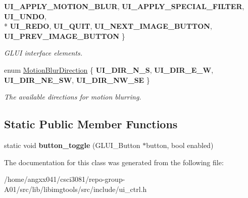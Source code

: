 \begin{DoxyCompactItemize}
{\bfseries U\+I\+\_\+\+A\+P\+P\+L\+Y\+\_\+\+M\+O\+T\+I\+O\+N\+\_\+\+B\+L\+UR}, 
{\bfseries U\+I\+\_\+\+A\+P\+P\+L\+Y\+\_\+\+S\+P\+E\+C\+I\+A\+L\+\_\+\+F\+I\+L\+T\+ER}, 
{\bfseries U\+I\+\_\+\+U\+N\+DO}, 
\\*
{\bfseries U\+I\+\_\+\+R\+E\+DO}, 
{\bfseries U\+I\+\_\+\+Q\+U\+IT}, 
{\bfseries U\+I\+\_\+\+N\+E\+X\+T\+\_\+\+I\+M\+A\+G\+E\+\_\+\+B\+U\+T\+T\+ON}, 
{\bfseries U\+I\+\_\+\+P\+R\+E\+V\+\_\+\+I\+M\+A\+G\+E\+\_\+\+B\+U\+T\+T\+ON}
 \}\hypertarget{classimage__tools_1_1UICtrl_a94c1180d7f5541b2d52d0f56ff6dfbd6}{}\label{classimage__tools_1_1UICtrl_a94c1180d7f5541b2d52d0f56ff6dfbd6}
\begin{DoxyCompactList}\small\item\em G\+L\+UI interface elements. \end{DoxyCompactList}
\item 
enum \hyperlink{classimage__tools_1_1UICtrl_a56d4f68bf91302769d7bc453d8d57cee}{Motion\+Blur\+Direction} \{ {\bfseries U\+I\+\_\+\+D\+I\+R\+\_\+\+N\+\_\+S}, 
{\bfseries U\+I\+\_\+\+D\+I\+R\+\_\+\+E\+\_\+W}, 
{\bfseries U\+I\+\_\+\+D\+I\+R\+\_\+\+N\+E\+\_\+\+SW}, 
{\bfseries U\+I\+\_\+\+D\+I\+R\+\_\+\+N\+W\+\_\+\+SE}
 \}\hypertarget{classimage__tools_1_1UICtrl_a56d4f68bf91302769d7bc453d8d57cee}{}\label{classimage__tools_1_1UICtrl_a56d4f68bf91302769d7bc453d8d57cee}
\begin{DoxyCompactList}\small\item\em The available directions for motion blurring. \end{DoxyCompactList}
\end{DoxyCompactItemize}
\subsection*{Static Public Member Functions}
\begin{DoxyCompactItemize}
\item 
static void {\bfseries button\+\_\+toggle} (G\+L\+U\+I\+\_\+\+Button $\ast$button, bool enabled)\hypertarget{classimage__tools_1_1UICtrl_ab69f0e1ea369485305d87820b61e1a50}{}\label{classimage__tools_1_1UICtrl_ab69f0e1ea369485305d87820b61e1a50}

\end{DoxyCompactItemize}


The documentation for this class was generated from the following file\+:\begin{DoxyCompactItemize}
\item 
/home/angxx041/csci3081/repo-\/group-\/\+A01/src/lib/libimgtools/src/include/ui\+\_\+ctrl.\+h\end{DoxyCompactItemize}

